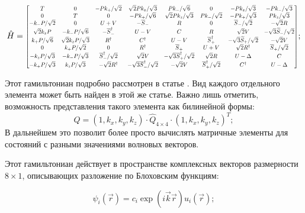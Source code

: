\documentclass[../main.tex]{subfiles}
\newcommand{\kp}{k_{+}}
\newcommand{\km}{k_{-}}
\newcommand{\kz}{k_{z}}
\newcommand{\stp}{\overline{S}_{+}}
\newcommand{\stm}{\overline{S}_{-}}
\newcommand{\swp}{\widetilde{S}_{+}}
\newcommand{\swm}{\widetilde{S}_{-}}
\begin{document}
    \begin{equation}
        \hat{H} =
            \rmatrix[0.7]{
                T       &   0       & -  P \kp  /\sqrt{2}   & \sqrt{2} P \kz / \sqrt{3} & P\km /\sqrt{6}        &   0       & -P\kz /\sqrt{3}   &   -P\km / \sqrt{3}\\
                0       &   T       &   0                   &   -P\kp /\sqrt{6}         &   \sqrt{2} P\kz / \sqrt{3}    &   P\km /\sqrt{2}  &   -P\kp / \sqrt{3}    & P\kz/\sqrt{3}\\
                -\km P/\sqrt{2} & 0 & U + V & -\stm & R &   0   & \stm / \sqrt{2}   & -\sqrt{2} R\\
                \sqrt{2} \kz P  & -\km P /\sqrt{6}  &   -\stm^\dagger   & U-V   &   C   &   R   & \sqrt{2} V & -\sqrt{3} \swm /\sqrt{2}\\
                \kp P /\sqrt{6} & \sqrt{2} \kz P /\sqrt{3}  & R^\dagger & C^\dagger & U - V & \stp^\dagger  & - \sqrt{3} \swp /\sqrt{2} & - \sqrt{2} V\\
                0   &   \kp P /\sqrt{2} & 0 & R^\dagger & \stp  & U+V   & \sqrt{2} R^\dagger    & \stp/\sqrt{2}\\
                -\kz P /\sqrt{3}    & - \km P / \sqrt{3}    & \stm^\dagger /\sqrt{2}    & \sqrt{2} V    & - \sqrt{3} \stp^\dagger /\sqrt{2} & \sqrt{2} R    & U - \Delta    & C\\
                -\kp P /\sqrt{3}    & \kz P /\sqrt{3}   & - \sqrt{2} R^\dagger  & -\sqrt{3} \stm^\dagger /\sqrt{2}  & -\sqrt{2} V   & \stp^\dagger /\sqrt{2}    & C^\dagger & U - \Delta
            };
    \end{equation} 

    Этот гамильтониан подробно рассмотрен в статье \cite{Novik:2005}.
    Вид каждого отдельного элемента может быть найден в этой же статье. Важно лишь
    отметить, возможность представления такого элемента как билинейной формы:
    \begin{equation}
        Q = (1,k_x,k_y,k_z) \cdot \hat{Q}_{4 \times 4} \cdot (1,k_x,k_y,k_z)^{T};
    \end{equation}
    В дальнейшем это позволит более просто вычислять матричные элементы для состояний
    с разными значениями волновых векторов.


    Этот гамильтониан действует в пространстве комплексных векторов размерности $8 \times 1$,
    описывающих разложение по Блоховским функциям:

    \begin{equation*}
        \psi_i(\vec r) = c_i \exp(i \vec k \vec r) u_i (\vec r);
    \end{equation*}
\end{document}
